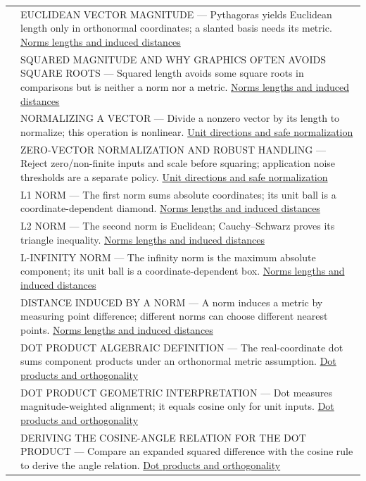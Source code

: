 {\begin{longtable}[]{@{}
  >{\raggedright\arraybackslash}p{}
  >{\raggedright\arraybackslash}p{}@{}}
526 & EUCLIDEAN VECTOR MAGNITUDE --- Pythagoras yields Euclidean length only in orthonormal coordinates; a slanted basis needs its metric. \hyperref[appendix-49933872bb51]{Norms lengths and induced distances} \\
527 & SQUARED MAGNITUDE AND WHY GRAPHICS OFTEN AVOIDS SQUARE ROOTS --- Squared length avoids some square roots in comparisons but is neither a norm nor a metric. \hyperref[appendix-49933872bb51]{Norms lengths and induced distances} \\
528 & NORMALIZING A VECTOR --- Divide a nonzero vector by its length to normalize; this operation is nonlinear. \hyperref[appendix-f744e41b95b4]{Unit directions and safe normalization} \\
529 & ZERO-VECTOR NORMALIZATION AND ROBUST HANDLING --- Reject zero/non-finite inputs and scale before squaring; application noise thresholds are a separate policy. \hyperref[appendix-f744e41b95b4]{Unit directions and safe normalization} \\
530 & L1 NORM --- The first norm sums absolute coordinates; its unit ball is a coordinate-dependent diamond. \hyperref[appendix-49933872bb51]{Norms lengths and induced distances} \\
531 & L2 NORM --- The second norm is Euclidean; Cauchy--Schwarz proves its triangle inequality. \hyperref[appendix-49933872bb51]{Norms lengths and induced distances} \\
532 & L-INFINITY NORM --- The infinity norm is the maximum absolute component; its unit ball is a coordinate-dependent box. \hyperref[appendix-49933872bb51]{Norms lengths and induced distances} \\
533 & DISTANCE INDUCED BY A NORM --- A norm induces a metric by measuring point difference; different norms can choose different nearest points. \hyperref[appendix-49933872bb51]{Norms lengths and induced distances} \\
534 & DOT PRODUCT ALGEBRAIC DEFINITION --- The real-coordinate dot sums component products under an orthonormal metric assumption. \hyperref[appendix-8bc4e8fc547c]{Dot products and orthogonality} \\
535 & DOT PRODUCT GEOMETRIC INTERPRETATION --- Dot measures magnitude-weighted alignment; it equals cosine only for unit inputs. \hyperref[appendix-8bc4e8fc547c]{Dot products and orthogonality} \\
536 & DERIVING THE COSINE-ANGLE RELATION FOR THE DOT PRODUCT --- Compare an expanded squared difference with the cosine rule to derive the angle relation. \hyperref[appendix-8bc4e8fc547c]{Dot products and orthogonality} \\

\end{longtable}}
